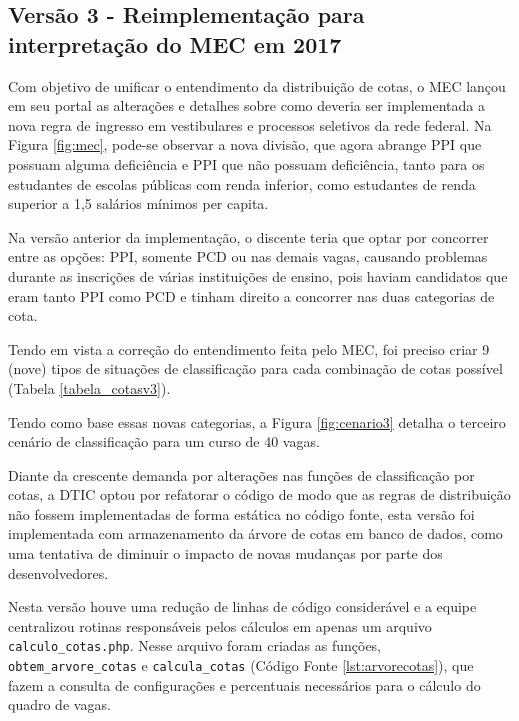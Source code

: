 \subsection{Versão 3 - Reimplementação para interpretação do MEC em 2017 }
\label{versao3}

Com objetivo de unificar o entendimento da distribuição de cotas, o \gls{MEC} lançou em seu portal as alterações e detalhes sobre como deveria ser implementada a nova regra de ingresso em vestibulares e processos seletivos da rede federal. Na Figura \ref{fig:mec}, pode-se observar a nova divisão, que agora abrange \gls{PPI} que possuam alguma deficiência e \gls{PPI} que não possuam deficiência, tanto para os estudantes de escolas públicas com renda inferior, como estudantes de renda superior a 1,5 salários mínimos per capita. 




Na versão anterior da implementação, o discente teria que optar por concorrer entre as opções: \gls{PPI}, somente \gls{PCD} ou nas demais vagas, causando problemas durante as inscrições de várias instituições de ensino, pois haviam candidatos que eram tanto \gls{PPI} como \gls{PCD} e tinham direito a concorrer nas duas categorias de cota.

Tendo em vista a correção do entendimento feita pelo \gls{MEC}, foi preciso criar 9 (nove) tipos de situações de classificação para cada combinação de cotas possível (Tabela \ref{tabela_cotasv3}).



Tendo como base essas novas categorias, a Figura \ref{fig:cenario3} detalha o terceiro cenário de classificação para um curso de 40 vagas. 



\newpage
Diante da crescente demanda por alterações nas funções de classificação por cotas, a \gls{DTIC} optou por refatorar o código de modo que as regras de distribuição não fossem implementadas de forma estática no código fonte, esta versão foi implementada com armazenamento da árvore de cotas em banco de dados, como uma tentativa de diminuir o impacto de novas mudanças por parte dos desenvolvedores. 

Nesta versão houve uma redução de linhas de código considerável e a equipe centralizou rotinas responsáveis pelos cálculos em apenas um arquivo \texttt{calculo\_cotas.php}. Nesse arquivo foram criadas as funções, \texttt{obtem\_arvore\_cotas} e \texttt{calcula\_cotas} (Código Fonte \ref{lst:arvorecotas}), que fazem a consulta de configurações e percentuais necessários para o cálculo do quadro de vagas. 

